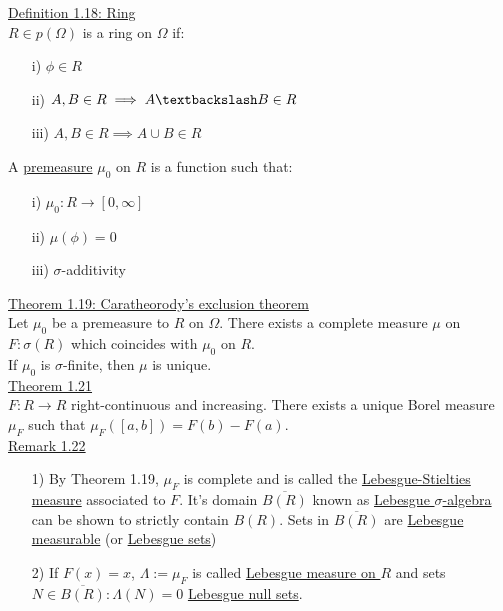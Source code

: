 \documentclass[10pt,letterpaper]{article}
\begin{document}
\underline{Definition 1.18: Ring}\\

$R\in p(\Omega)$ is a ring on $\Omega$ if:

\begin{enumerate}
\item[i)] $\phi\in R$
\item[ii)] $A,B\in R\implies A\textbackslash B\in R$
\item[iii)] $A,B\in R\implies A\cup B\in R$
\end{enumerate}

A \underline{premeasure} $\mu_0$ on $R$ is a function such that:

\begin{enumerate}
\item[i)] $\mu_0: R\rightarrow [0,\infty]$
\item[ii)] $\mu(\phi) = 0$
\item[iii)] $\sigma$-additivity
\end{enumerate}

\underline{Theorem 1.19: Caratheorody's exclusion theorem}\\

Let $\mu_0$ be a premeasure to $R$ on $\Omega$. There exists a complete measure $\mu$ on $F:\sigma(R)$
which coincides with $\mu_0$ on $R$.\\

If $\mu_0$ is $\sigma$-finite, then $\mu$ is unique.\\

\underline{Theorem 1.21}\\

$F:R\rightarrow R$ right-continuous and increasing. There exists a unique Borel measure $\mu_F$
such that $\mu_F([a,b])=F(b)-F(a)$.\\

\underline{Remark 1.22}\\

\begin{enumerate}
\item[1)] By Theorem 1.19, $\mu_F$ is complete and is called the 
\underline{Lebesgue-Stielties measure} associated to $F$. It's domain $\overline{B(R)}$ known as
\underline{Lebesgue $\sigma$-algebra} can be shown to strictly contain $B(R)$. Sets in 
$\overline{B(R)}$ are \underline{Lebesgue measurable} (or \underline{Lebesgue sets})
\item[2)] If $F(x) = x$, $\Lambda :=\mu_F$ is called \underline{Lebesgue measure on $R$}
and sets $N\in \overline{B(R)}: \Lambda(N)=0$ \underline{Lebesgue null sets}.
\end{enumerate}
\end{document}
